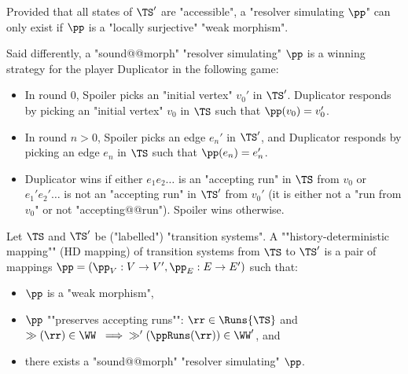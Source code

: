 \documentclass{theoretics}
\begin{document}
\begin{remark}\label{rmk-morph: HD-is-loc.surjective}
	Provided that all states of $\TS'$ are "accessible", a "resolver simulating $\pp$" can only exist if $\pp$ is a "locally surjective" "weak morphism".
\end{remark}



Said differently, a "sound@@morph" "resolver simulating" $\pp$ is a winning strategy for the player Duplicator in the following game:
\begin{itemize}
	\item In round $0$, Spoiler picks an "initial vertex" $v_0'$ in $\TS'$. Duplicator responds by picking an "initial vertex" $v_0$ in $\TS$ such that $\pp(v_0) = v_0'$.
	\item In round $n>0$, Spoiler picks an edge $e_n'$ in $\TS'$, and Duplicator responds by picking an edge $e_n$ in $\TS$ such that $\pp(e_n) = e_n'$.
	\item Duplicator wins if either $e_1e_2\dots$ is an "accepting run" in $\TS$ from $v_0$ or $e_1'e_2'\dots$ is not an "accepting run" in $\TS'$ from $v_0'$ (it is either not a "run from $v_0$" or not "accepting@@run"). Spoiler wins otherwise.
\end{itemize}


\begin{definition}\label{def:HD_mapping}
	Let $\TS$ and $\TS'$ be ("labelled") "transition systems".
	\AP A ""history-deterministic mapping"" (HD mapping) of transition systems from $\TS$ to $\TS'$ is a pair of mappings $\pp = (\pp_V: V \rightarrow V', \pp_E: E \rightarrow E')$ such that:
	\begin{itemize}
		\item $\pp$ is a "weak morphism",
		\item $\pp$ ""preserves accepting runs"":  $\rr \in \Runs{\TS}$ and  $\gg(\rr) \in \WW \; \implies \; \gg'(\ppRuns(\rr)) \in \WW'$, and%
		\item there exists a "sound@@morph" "resolver simulating" $\pp$. 
	\end{itemize}
\end{definition}
\end{document}
